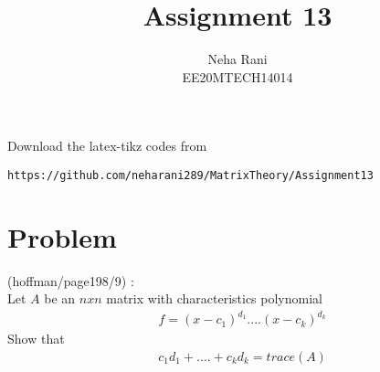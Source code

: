 \documentclass[journal,12pt]{IEEEtran}
\begin{document}
     \def\rightbox#1{\makebox[0in][r]{#1}}
     \def\centbox#1{\makebox[0in]{#1}}
     \def\topbox#1{\raisebox{-\baselineskip}[0in][0in]{#1}}
     \def\midbox#1{\raisebox{-0.5\baselineskip}[0in][0in]{#1}}
\vspace{3cm}
\title{Assignment 13}
\author{Neha Rani\\EE20MTECH14014}
\maketitle
\bigskip
\renewcommand{\thefigure}{\theenumi}
\renewcommand{\thetable}{\theenumi}
%
Download the latex-tikz codes from 
%
\begin{lstlisting}
https://github.com/neharani289/MatrixTheory/Assignment13
\end{lstlisting}
\section{\textbf{Problem}}
(hoffman/page198/9) : \\
%
Let $A$ be an $nxn$ matrix with characteristics polynomial\\
\begin{align}
& f = (x-c_1)^{d_1}....(x-c_k)^{d_k} \nonumber
\end{align}
Show that
\begin{align}
& c_1d_1+....+c_kd_k = trace(A)\nonumber
\end{align}
%
%
%
\end{document}
